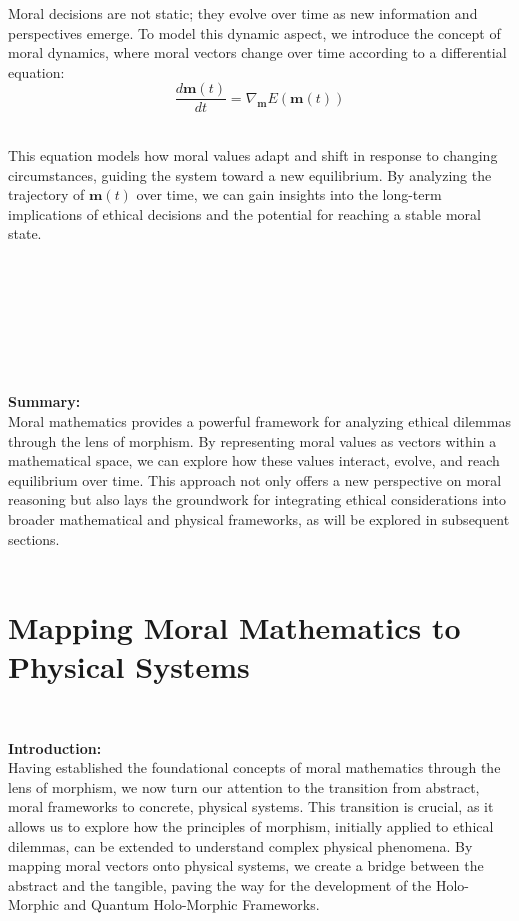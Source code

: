 \documentclass{article}
\begin{document}
Moral decisions are not static; they evolve over time as new information and perspectives emerge. To model this dynamic aspect, we introduce the concept of moral dynamics, where moral vectors change over time according to a differential equation:
\[
\frac{d\mathbf{m}(t)}{dt} = \nabla_{\mathbf{m}} E(\mathbf{m}(t))
\]
\

This equation models how moral values adapt and shift in response to changing circumstances, guiding the system toward a new equilibrium. By analyzing the trajectory of \( \mathbf{m}(t) \) over time, we can gain insights into the long-term implications of ethical decisions and the potential for reaching a stable moral state.
\

\

\

\

\

\textbf{Summary:}
\\

Moral mathematics provides a powerful framework for analyzing ethical dilemmas through the lens of morphism. By representing moral values as vectors within a mathematical space, we can explore how these values interact, evolve, and reach equilibrium over time. This approach not only offers a new perspective on moral reasoning but also lays the groundwork for integrating ethical considerations into broader mathematical and physical frameworks, as will be explored in subsequent sections.
\\

\
\section*{Mapping Moral Mathematics to Physical Systems}
\

\textbf{Introduction:}
\\

Having established the foundational concepts of moral mathematics through the lens of morphism, we now turn our attention to the transition from abstract, moral frameworks to concrete, physical systems. This transition is crucial, as it allows us to explore how the principles of morphism, initially applied to ethical dilemmas, can be extended to understand complex physical phenomena. By mapping moral vectors onto physical systems, we create a bridge between the abstract and the tangible, paving the way for the development of the Holo-Morphic and Quantum Holo-Morphic Frameworks.
\\
\\
\end{document}
